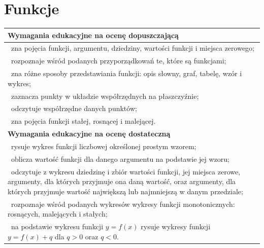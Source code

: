\documentclass[12pt,a4paper]{article}
\begin{document}
	\section{Funkcje}
	
	\begin{longtable}{|p{16cm}|}
		\hline
		
		\textbf{Wymagania edukacyjne na ocenę dopuszczającą} \\ \hline
		
		\textbullet\ zna pojęcia funkcji, argumentu, dziedziny, wartości funkcji i miejsca zerowego; \\
		
		\textbullet\ rozpoznaje wśród podanych przyporządkowań te, które są funkcjami; \\
		
		\textbullet\ zna różne sposoby przedstawiania funkcji: opis słowny, graf, tabelę, wzór i wykres; \\
		
		\textbullet\ zaznacza punkty w układzie współrzędnych na płaszczyźnie; \\
		
		\textbullet\ odczytuje współrzędne danych punktów; \\
		
		\textbullet\ zna pojęcia funkcji stałej, rosnącej i malejącej. \\ \hline
		
		\textbf{Wymagania edukacyjne na ocenę dostateczną} \\ \hline
		
		\textbullet\ rysuje wykres funkcji liczbowej określonej prostym wzorem; \\
		
		\textbullet\ oblicza wartość funkcji dla danego argumentu na podstawie jej wzoru; \\
		
		\textbullet\ odczytuje z wykresu dziedzinę i zbiór wartości funkcji, jej miejsca zerowe, argumenty, dla których przyjmuje ona daną wartość, oraz argumenty, dla których przyjmuje wartość największą lub najmniejszą w danym przedziale; \\
		
		\textbullet\ rozpoznaje wśród podanych wykresów wykresy funkcji monotonicznych: rosnących, malejących i stałych; \\
		
		\textbullet\ na podstawie wykresu funkcji $y=f(x)$ rysuje wykresy funkcji $y=f(x)+q$ dla $q>0$ oraz $q<0$. \\ \hline
		

\end{longtable}
\end{document}
